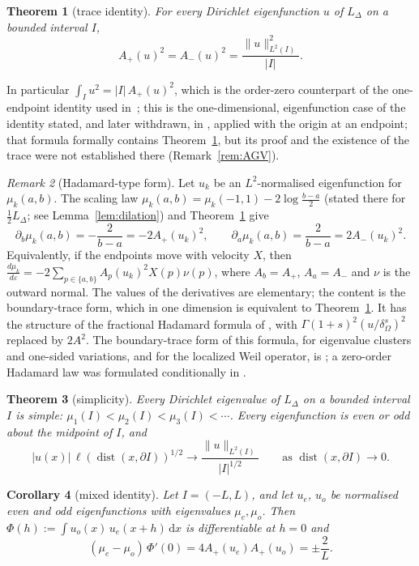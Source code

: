 \documentclass[11pt]{amsart}
\newcommand{\LD}{L_\Delta}
\newcommand{\eps}{\varepsilon}
\newcommand{\dd}{\,\mathrm{d}}
\DeclareMathOperator{\dist}{dist}
\newtheorem{theorem}{Theorem}[section]
\newtheorem{corollary}[theorem]{Corollary}
\theoremstyle{definition}
\theoremstyle{remark}
\newtheorem{remark}[theorem]{Remark}
\numberwithin{equation}{section}
\begin{document}
\begin{theorem}[trace identity]\label{thm:B}
For every Dirichlet eigenfunction $u$ of $\LD$ on a bounded interval $I$,
\[
A_+(u)^2=A_-(u)^2=\frac{\|u\|_{L^2(I)}^2}{|I|}.
\]
\end{theorem}

In particular $\int_I u^2=|I|\,A_+(u)^2$, which is the order-zero counterpart of the one-endpoint identity used in~\cite{Kw23}; this is the one-dimensional, eigenfunction case of the identity stated, and later withdrawn, in \cite[Thm.~2.3, Cor.~3.8]{AGV24}, applied with the origin at an endpoint; that formula formally contains Theorem~\ref{thm:B}, but its proof and the existence of the trace were not established there (Remark~\ref{rem:AGV}).

\begin{remark}[Hadamard-type form]\label{rem:hadamard}
Let $u_k$ be an $L^2$-normalised eigenfunction for $\mu_k(a,b)$. The scaling law $\mu_k(a,b)=\mu_k(-1,1)-2\log\frac{b-a}2$ \cite[Lemma~2.5]{LW21} (stated there for $\frac12\LD$; see Lemma~\ref{lem:dilation}) and Theorem~\ref{thm:B} give
\[
\partial_b\mu_k(a,b)=-\frac2{b-a}=-2A_+(u_k)^2,\qquad\partial_a\mu_k(a,b)=\frac2{b-a}=2A_-(u_k)^2 .
\]
Equivalently, if the endpoints move with velocity $X$, then $\frac{d\mu_k}{d\eps}=-2\sum_{p\in\{a,b\}}A_p(u_k)^2X(p)\nu(p)$, where $A_b=A_+$, $A_a=A_-$ and $\nu$ is the outward normal. The values of the derivatives are elementary; the content is the boundary-trace form, which in one dimension is equivalent to Theorem~\ref{thm:B}. It has the structure of the fractional Hadamard formula of \cite[Thm.~1.1, Cor.~1.2]{DFW21}, with $\Gamma(1+s)^2(u/\delta_\Omega^s)^2$ replaced by $2A^2$. The boundary-trace form of this formula, for eigenvalue clusters and one-sided variations, and for the localized Weil operator, is \cite[Thms.~2.1--2.2]{BT26}; a zero-order Hadamard law was formulated conditionally in \cite[PL-306]{Mathia26}.
\end{remark}

\begin{theorem}[simplicity]\label{thm:C}
Every Dirichlet eigenvalue of $\LD$ on a bounded interval $I$ is simple: $\mu_1(I)<\mu_2(I)<\mu_3(I)<\cdots$. Every eigenfunction is even or odd about the midpoint of $I$, and
\[
|u(x)|\,\ell(\dist(x,\partial I))^{1/2}\longrightarrow\frac{\|u\|_{L^2(I)}}{|I|^{1/2}}\qquad\text{as }\dist(x,\partial I)\to0 .
\]
\end{theorem}

\begin{corollary}[mixed identity]\label{cor:D}
Let $I=(-L,L)$, and let $u_e$, $u_o$ be normalised even and odd eigenfunctions with eigenvalues $\mu_e,\mu_o$. Then $\Phi(h):=\int u_o(x)\,u_e(x+h)\dd x$ is differentiable at $h=0$ and
\[
(\mu_e-\mu_o)\,\Phi'(0)=4A_+(u_e)A_+(u_o)=\pm\frac2L .
\]
\end{corollary}
\end{document}
